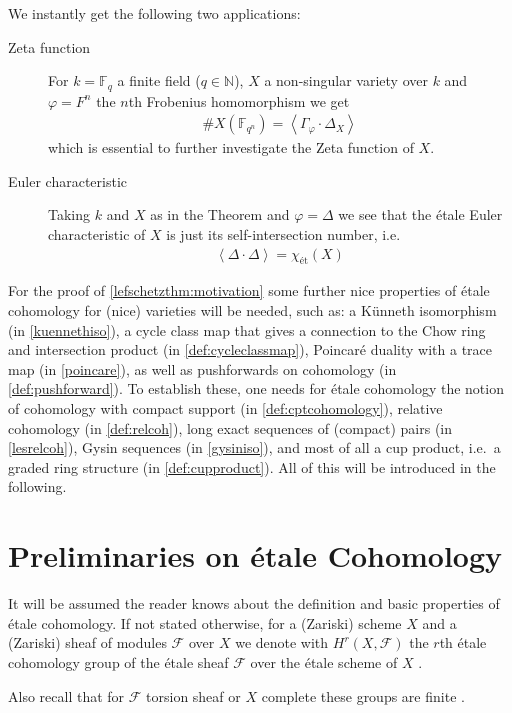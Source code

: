 \documentclass[english]{scrartcl}
\theoremstyle{definition}
\theoremstyle{remark}
\newcommand*{\N}{\mathds{N}}
\newcommand*{\fF}{\mathds{F}} %
\newcommand*{\F}{\mathcal{F}} %
\newcommand*{\idest}{i.e.\ }
\newcommand*{\forexample}{e.g.\ }
\newcommand*{\intProd}[2]{{#1\cdot#2}} %
\newcommand*{\intNum}[1]{{\left\langle{#1}\right\rangle}} %
\newcommand*{\Graph}[1]{{\Gamma_{#1}}} %
\newcommand*{\Diag}[1]{{\Delta_{#1}}} %
\renewcommand*{\phi}{\varphi}
\begin{document}
We instantly get the following two applications:
\begin{description}
\item[Zeta function] For
  $k=\fF_{q}$ a finite field ($q\in\N$),
  $X$ a non-singular variety over $k$ and
  $\phi=F^n$ the $n$th Frobenius homomorphism
  we get
  \begin{gather*}
    \#X(\fF_{q^n}) = \intNum{\intProd{\Graph\phi}{\Diag X}}
  \end{gather*}
  which is essential to further investigate the Zeta function of $X$.
\item[Euler characteristic] Taking $k$ and $X$ as in the Theorem and
  $\phi=\Delta$ we see that the étale Euler characteristic of $X$ is
  just its self-intersection number, \idest
  \begin{gather*}
    \intNum{\intProd{\Delta}{\Delta}} = \chi_{\text{ét}}(X)
  \end{gather*}
\end{description}

For the proof of \ref{lefschetzthm:motivation}
some further nice properties of étale cohomology for
(nice) varieties will be needed, such as:
a Künneth isomorphism (in \autoref{kuennethiso}),
a cycle class map that gives a connection to the Chow ring and
intersection product (in \autoref{def:cycleclassmap}),
Poincaré duality with a trace map (in \autoref{poincare}),
as well as pushforwards on cohomology (in \autoref{def:pushforward}).
To establish these, one needs for étale cohomology the notion of
cohomology with compact support (in \autoref{def:cptcohomology}),
relative cohomology (in \autoref{def:relcoh}),
long exact sequences of (compact) pairs (in \autoref{lesrelcoh}),
Gysin sequences (in \autoref{gysiniso}),
and most of all a cup product, \idest a graded ring structure
(in \autoref{def:cupproduct}).
All of this will be introduced in the following.

\section{Preliminaries on étale Cohomology}
It will be assumed the reader knows about the definition and basic
properties of étale cohomology. If not stated otherwise, for a
(Zariski) scheme $X$ and a (Zariski) sheaf of modules $\F$ over $X$ we
denote with $H^r(X,\F)$ the $r$th étale cohomology group of the étale
sheaf $\F$ over the étale scheme of $X$
\cite[compare][Chap.~6, Examples of Sheaves on $X_\text{ét}$]{milne}.

Also recall that for $\F$ torsion sheaf or $X$ complete these groups
are finite \cite[\forexample][Thm.~19.1]{milne}.
\end{document}
